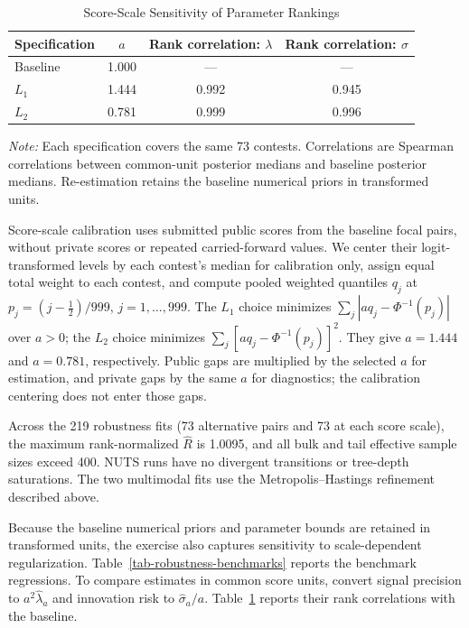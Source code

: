 \documentclass[mnsc]{informs3}
\begin{document}
\begin{APPENDICES}
\begin{table}[!htbp]
\centering
\caption{Score-Scale Sensitivity of Parameter Rankings}
\label{tab-score-scale-robustness}
\begin{tabular}{lccc}
\toprule
Specification & $a$ & Rank correlation: $\lambda$ & Rank correlation: $\sigma$\\
\midrule
Baseline & 1.000 & --- & ---\\
$L_1$ & 1.444 & 0.992 & 0.945\\
$L_2$ & 0.781 & 0.999 & 0.996\\
\bottomrule
\end{tabular}
\par\vspace{0.5ex}\noindent
\begin{minipage}{\textwidth}
{\footnotesize\textit{Note:} Each specification covers the same 73 contests. Correlations are Spearman correlations between common-unit posterior medians and baseline posterior medians. Re-estimation retains the baseline numerical priors in transformed units.}
\end{minipage}
\end{table}

{Score-scale calibration uses submitted public scores from the baseline focal pairs, without private scores or repeated carried-forward values. We center their logit-transformed levels by each contest's median for calibration only, assign equal total weight to each contest, and compute pooled weighted quantiles $q_j$ at $p_j=(j-\tfrac12)/999$, $j=1,\ldots,999$. The $L_1$ choice minimizes $\sum_j|a q_j-\Phi^{-1}(p_j)|$ over $a>0$; the $L_2$ choice minimizes $\sum_j[a q_j-\Phi^{-1}(p_j)]^2$. They give $a=1.444$ and $a=0.781$, respectively. Public gaps are multiplied by the selected $a$ for estimation, and private gaps by the same $a$ for diagnostics; the calibration centering does not enter those gaps.}

Across the 219 robustness fits (73 alternative pairs and 73 at each score scale), the maximum rank-normalized $\widehat R$ is 1.0095, and all bulk and tail effective sample sizes exceed 400. NUTS runs have no divergent transitions or tree-depth saturations. The two multimodal fits use the Metropolis--Hastings refinement described above.

Because the baseline numerical priors and parameter bounds are retained in transformed units, the exercise also captures sensitivity to scale-dependent regularization. Table~\ref{tab-robustness-benchmarks} reports the benchmark regressions.
To compare estimates in common score units, convert signal precision to $a^2\hat\lambda_a$ and innovation risk to $\hat\sigma_a/a$. Table~\ref{tab-score-scale-robustness} reports their rank correlations with the baseline.




\end{APPENDICES}
\end{document}
